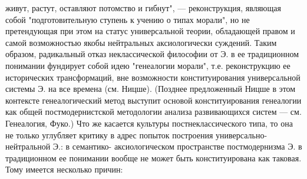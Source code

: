 \documentclass[12pt]{article}
\begin{document}
живут, растут, оставляют потомство и гибнут", — реконструкция, являющая собой "подготовительную ступень
к учению о типах морали", но не претендующая при этом на статус универсальной теории, обладающей правом
и  самой  возможностью  якобы  нейтральных  аксиологически  суждений.  Таким  образом,  радикальный  отказ
неклассической философии от Э. в ее традиционном понимании фундирует собой идею "генеалогии морали",
т.е.  реконструкцию  ее  исторических  трансформаций,  вне  возможности  конституирования  универсальной
системы Э. на все времена (см. Ницше). (Позднее предложенный Ницше в этом контексте генеалогический
метод выступит основой конституирования генеалогии как общей постмодернистской методологии анализа
развивающихся систем — см. Генеалогия, Фуко.) Что же касается культуры постнеклассического типа, то она не
только  углубляет  критику  в  адрес  попыток  построения  универсально-нейтральной  Э.:  в  семантико-
аксиологическом  пространстве  постмодернизма  Э.  в  традиционном  ее  понимании  вообще  не  может  быть
конституирована как таковая. Тому имеется несколько причин:
\end{document}
